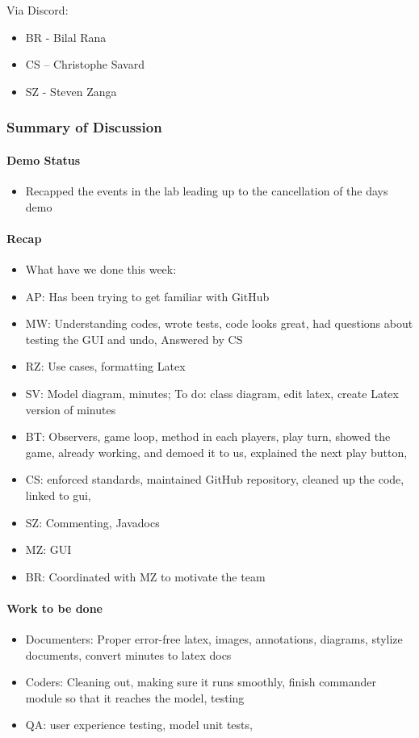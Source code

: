 \documentclass[10pt, a4paper]{article}
\begin{document}
			Via Discord:
			\begin{itemize}
				\item BR - Bilal Rana
				\item CS – Christophe Savard 
				\item SZ - Steven Zanga
			\end{itemize}
			
			\subsubsection{Summary of Discussion }
			
			\paragraph{Demo Status}
			\begin{itemize}
				\item Recapped the events in the lab leading up to the cancellation of the days demo
			\end{itemize}
			
			\paragraph{Recap }
			\begin{itemize}
				\item What have we done this week: 
				\item AP: Has been trying to get familiar with GitHub 
				\item MW: Understanding codes, wrote tests, code looks great, had questions about testing the GUI and undo, Answered by CS 
				\item RZ: Use cases, formatting Latex 
				\item SV: Model diagram, minutes;  To do: class diagram, edit latex, create Latex version of minutes 
				\item BT: Observers, game loop, method in each players, play turn, showed the game, already working, and demoed it to us, explained the next play button, 
				\item CS: enforced standards, maintained GitHub repository, cleaned up the code, linked to gui, 
				\item SZ: Commenting, Javadocs
				\item MZ: GUI 
				\item BR: Coordinated with MZ to motivate the team  
			\end{itemize}
			
			\paragraph{Work to be done }
			\begin{itemize}
				\item Documenters: Proper error-free latex, images, annotations, diagrams, stylize documents, convert minutes to latex docs
				\item Coders: Cleaning out, making sure it runs smoothly, finish commander module so that it reaches the model, testing  
				\item QA: user experience testing, model unit tests, 
			\end{itemize}
			
\end{document}
